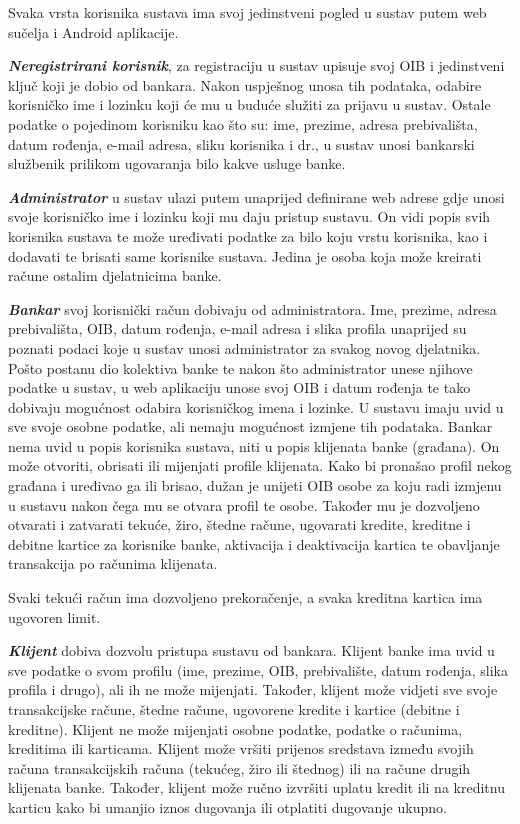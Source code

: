		Svaka vrsta korisnika sustava ima svoj jedinstveni pogled u sustav putem web sučelja i Android aplikacije.
		
		\textit{\textbf{Neregistrirani korisnik}}, za registraciju u sustav upisuje svoj OIB i jedinstveni ključ koji je dobio od bankara. Nakon uspješnog unosa tih podataka, odabire korisničko ime i lozinku koji će mu u buduće služiti za prijavu u sustav. Ostale podatke o pojedinom korisniku kao što su: ime, prezime, adresa prebivališta, datum rođenja, e-mail adresa, sliku korisnika i dr., u sustav unosi bankarski službenik prilikom ugovaranja bilo kakve usluge banke.
		
		\textit{\textbf{Administrator}} u sustav ulazi putem unaprijed definirane web adrese gdje unosi svoje korisničko ime i lozinku koji mu daju pristup sustavu. On vidi popis svih korisnika sustava te može uređivati podatke za bilo koju vrstu korisnika, kao i dodavati te brisati same korisnike sustava. Jedina je osoba koja može kreirati račune ostalim djelatnicima banke.
		
		\textit{\textbf{Bankar}} svoj korisnički račun dobivaju od administratora. Ime, prezime, adresa prebivališta, OIB, datum rođenja, e-mail adresa i slika profila unaprijed su poznati podaci koje u sustav unosi administrator za svakog novog djelatnika. Pošto postanu dio kolektiva banke te nakon što administrator unese njihove podatke u sustav, u web aplikaciju unose svoj OIB i datum rođenja te tako dobivaju mogućnost odabira korisničkog imena i lozinke. U sustavu imaju uvid u sve svoje osobne podatke, ali nemaju mogućnost izmjene tih podataka.
		Bankar nema uvid u popis korisnika sustava, niti u popis klijenata banke (građana). On može otvoriti, obrisati ili mijenjati profile klijenata. Kako bi pronašao profil nekog građana i uređivao ga ili brisao, dužan je unijeti OIB osobe za koju radi izmjenu u sustavu nakon čega mu se otvara profil te osobe. Također mu je dozvoljeno otvarati i zatvarati tekuće, žiro, štedne račune, ugovarati kredite, kreditne i debitne kartice za korisnike banke, aktivacija i deaktivacija kartica te obavljanje transakcija po računima klijenata.
		
		Svaki tekući račun ima dozvoljeno prekoračenje, a svaka kreditna kartica ima ugovoren limit.
		
		\textit{\textbf{Klijent}} dobiva dozvolu pristupa sustavu od bankara. Klijent banke ima uvid u sve podatke o svom profilu (ime, prezime, OIB, prebivalište, datum rođenja, slika profila i drugo), ali ih ne može mijenjati. Također, klijent može vidjeti sve svoje transakcijske račune, štedne račune, ugovorene kredite i kartice (debitne i kreditne). Klijent ne može mijenjati osobne podatke, podatke o računima, kreditima ili karticama. Klijent može vršiti prijenos sredstava između svojih računa transakcijskih računa (tekućeg, žiro ili štednog) ili na račune drugih klijenata banke. Također, klijent može ručno izvršiti uplatu kredit ili na kreditnu karticu kako bi umanjio iznos dugovanja ili otplatiti dugovanje ukupno.
		
